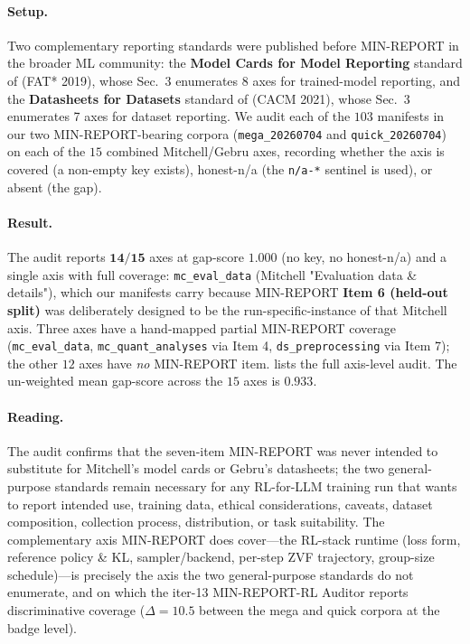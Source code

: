 \paragraph{Setup.} Two complementary reporting standards were
published before MIN-REPORT in the broader ML community: the
\textbf{Model Cards for Model Reporting} standard of
\citet{mitchell2019modelcards} (FAT* 2019), whose Sec.~3 enumerates
8 axes for trained-model reporting, and the \textbf{Datasheets for
Datasets} standard of \citet{gebru2021datasheets} (CACM 2021), whose
Sec.~3 enumerates 7 axes for dataset reporting. We audit each of the
$103$ manifests in our two MIN-REPORT-bearing corpora
(\texttt{mega\_20260704} and \texttt{quick\_20260704}) on each of
the $15$ combined Mitchell/Gebru axes, recording whether the axis
is covered (a non-empty key exists), honest-n/a (the \texttt{n/a-*}
sentinel is used), or absent (the gap).

\paragraph{Result.} The audit reports $\mathbf{14/15}$ axes at
gap-score $1.000$ (no key, no honest-n/a) and a single axis with full
coverage: \texttt{mc\_eval\_data} (Mitchell "Evaluation data \&
details"), which our manifests carry because MIN-REPORT \textbf{Item 6
(held-out split)} was deliberately designed to be the
run-specific-instance of that Mitchell axis. Three axes have a
hand-mapped partial MIN-REPORT coverage (\texttt{mc\_eval\_data},
\texttt{mc\_quant\_analyses} via Item 4, \texttt{ds\_preprocessing}
via Item 7); the other $12$ axes have \emph{no} MIN-REPORT item.
 lists the full axis-level
audit. The un-weighted mean gap-score across the $15$ axes is
$0.933$.

\paragraph{Reading.} The audit confirms that the seven-item
MIN-REPORT was never intended to substitute for Mitchell's model
cards or Gebru's datasheets; the two general-purpose standards remain
necessary for any RL-for-LLM training run that wants to report
intended use, training data, ethical considerations, caveats,
dataset composition, collection process, distribution, or task
suitability. The complementary axis MIN-REPORT does cover---the
RL-stack runtime (loss form, reference policy \& KL, sampler/backend,
per-step ZVF trajectory, group-size schedule)---is precisely the axis
the two general-purpose standards do not enumerate, and on which the
iter-13 MIN-REPORT-RL Auditor reports discriminative coverage
($\Delta = 10.5$ between the mega and quick corpora at the badge
level).

